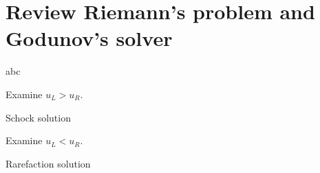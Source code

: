 \documentclass[12pt]{article}
\begin{document}
\clearpage
\section{Review Riemann's problem and Godunov's solver}
\begin{example}
	abc
\end{example}

\clearpage
\begin{example}
	Examine $u_{L} > u_{R}$.
\end{example}
Schock solution

\clearpage
\begin{example}
	Examine $u_{L} < u_{R}$.
\end{example}
Rarefaction solution
\end{document}
